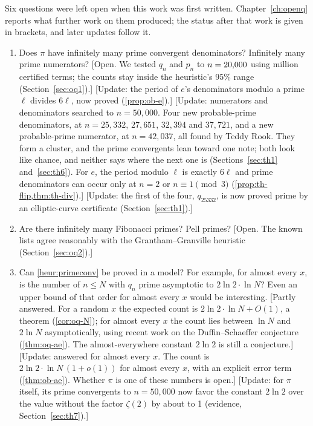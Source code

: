 Six questions were left open when this work was first written. Chapter~\ref{ch:openq} reports what further work on them produced; the status after that work is given in brackets, and later updates follow it. \addedon{\revA}
\begin{enumerate}
\item Does $\pi$ have infinitely many prime convergent denominators? Infinitely many prime numerators? [Open. We tested $q_n$ and $p_n$ to $n = 20{,}000$ using \OqNTm{} million certified terms; the counts stay inside the heuristic's 95\% range (Section~\ref{sec:oq1}).] \addedon{\revA} [Update: the period of $e$'s denominators modulo a prime $\ell$ divides $6\ell$, now proved (\cref{prop:ob-e}).] \addedon{\revB} [Update: numerators and denominators searched to $n = 50{,}000$. Four new probable-prime denominators, at $n = 25{,}332$, $27{,}651$, $32{,}394$ and $37{,}721$, and a new probable-prime numerator, at $n = 42{,}037$, all found by Teddy Rook. They form a cluster, and the prime convergents lean toward one note; both look like chance, and neither says where the next one is (Sections~\ref{sec:th1} and~\ref{sec:th6}). For $e$, the period modulo $\ell$ is exactly $6\ell$ and prime denominators can occur only at $n = 2$ or $n \equiv 1 \pmod 3$ (\cref{prop:th-flip,thm:th-div}).] \addedon{\revC} [Update: the first of the four, $q_{25332}$, is now proved prime by an elliptic-curve certificate (Section~\ref{sec:th1}).] \addedon{\revG}
\item Are there infinitely many Fibonacci primes? Pell primes? [Open. The known lists agree reasonably with the Grantham--Granville heuristic (Section~\ref{sec:oq2}).] \addedon{\revA}
\item Can \cref{heur:primeconv} be proved in a model? For example, for almost every $x$, is the number of $n \le N$ with $q_n$ prime asymptotic to $2\ln 2 \cdot \ln N$? Even an upper bound of that order for almost every $x$ would be interesting. [Partly answered. For a random $x$ the expected count is $2\ln 2\cdot\ln N + O(1)$, a theorem (\cref{cor:oq-N}); for almost every $x$ the count lies between $\ln N$ and $2\ln N$ asymptotically, using recent work on the Duffin--Schaeffer conjecture (\cref{thm:oq-ae}). The almost-everywhere constant $2\ln 2$ is still a conjecture.] \addedon{\revA} [Update: answered for almost every $x$. The count is $2\ln 2\cdot\ln N\,(1 + o(1))$ for almost every $x$, with an explicit error term (\cref{thm:ob-ae}). Whether $\pi$ is one of these numbers is open.] \addedon{\revB} [Update: for $\pi$ itself, its prime convergents to $n = 50{,}000$ now favor the constant $2\ln 2$ over the value without the factor $\zeta(2)$ by about \RaFiLR{} to 1 (evidence, Section~\ref{sec:th7}).] \addedon{\revC}

\end{enumerate}
